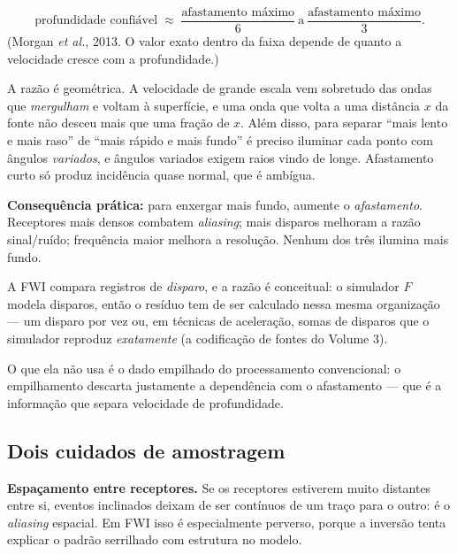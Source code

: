 \documentclass[11pt,a4paper,oneside]{report}
\begin{document}
\begin{teoria}
\[
\text{profundidade confi\'avel} \;\approx\;
\frac{\text{afastamento m\'aximo}}{6}\ \text{a}\
\frac{\text{afastamento m\'aximo}}{3}.
\]
(Morgan \emph{et al.}, 2013. O valor exato dentro da faixa depende de quanto a
velocidade cresce com a profundidade.)

A raz\~ao \'e geom\'etrica. A velocidade de grande escala vem sobretudo das
ondas que \emph{mergulham} e voltam \`a superf\'icie, e uma onda que volta a
uma dist\^ancia $x$ da fonte n\~ao desceu mais que uma fra\c{c}\~ao de $x$. Al\'em
disso, para separar ``mais lento e mais raso'' de ``mais r\'apido e mais
fundo'' \'e preciso iluminar cada ponto com \^angulos \emph{variados}, e
\^angulos variados exigem raios vindo de longe. Afastamento curto s\'o produz
incid\^encia quase normal, que \'e amb\'igua.

\textbf{Consequ\^encia pr\'atica:} para enxergar mais fundo, aumente o
\emph{afastamento}. Receptores mais densos combatem \emph{aliasing}; mais
disparos melhoram a raz\~ao sinal/ru\'ido; frequ\^encia maior melhora a
resolu\c{c}\~ao. Nenhum dos tr\^es ilumina mais fundo.
\end{teoria}

\begin{atencao}
A FWI compara registros de \emph{disparo}, e a raz\~ao \'e conceitual: o
simulador $F$ modela disparos, ent\~ao o res\'iduo tem de ser calculado nessa
mesma organiza\c{c}\~ao --- um disparo por vez ou, em t\'ecnicas de
acelera\c{c}\~ao, somas de disparos que o simulador reproduz \emph{exatamente}
(a codifica\c{c}\~ao de fontes do Volume 3).

O que ela n\~ao usa \'e o dado empilhado do processamento convencional: o
empilhamento descarta justamente a depend\^encia com o afastamento --- que \'e
a informa\c{c}\~ao que separa velocidade de profundidade.
\end{atencao}

\subsection*{Dois cuidados de amostragem}

\textbf{Espa\c{c}amento entre receptores.} Se os receptores estiverem muito
distantes entre si, eventos inclinados deixam de ser cont\'inuos de um
tra\c{c}o para o outro: \'e o \emph{aliasing} espacial. Em FWI isso \'e
especialmente perverso, porque a invers\~ao tenta explicar o padr\~ao
serrilhado com estrutura no modelo.
\end{document}

